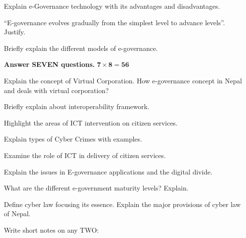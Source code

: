 \documentclass[a4paper, twoside, 12pt, noanswers]{exam}
\begin{document}
\begin{questions}
	
	\question Explain e-Governance technology with its advantages and disadvantages.
	
	\question “E-governance evolves gradually from the simplest level to advance levels”. Justify.
	
	\question Briefly explain the different models of e-governance.
	
		
	{\par}
	{\hspace*{-0.5cm}\noindent\bfseries Answer SEVEN questions.} \hfill {\( \mathbf{7 \times 8 = 56}\)}
	
	\question Explain the concept of Virtual Corporation. How e-governance concept in Nepal and deals with virtual corporation?
	
	\question Briefly explain about interoperability framework.
	
	\question Highlight the areas of ICT intervention on citizen services. 
	
	\question Explain types of Cyber Crimes with examples.
	
	\question Examine the role of ICT in delivery of citizen services.
	
	\question Explain the issues in E-governance applications and the digital divide.
	
	\question What are the different e-government maturity levels? Explain.
	
	\question Define cyber law focusing its essence. Explain the major provisions of cyber law of Nepal.
	
	
	\newpage
	
	\question Write short notes on any TWO:
\end{questions}
\end{document}

